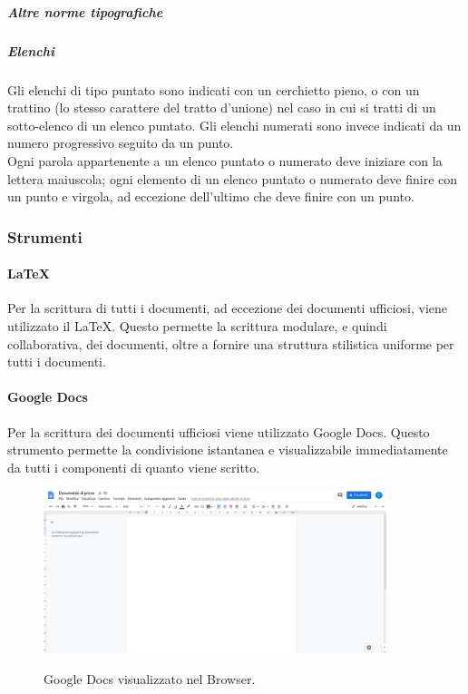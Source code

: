\documentclass[../norme-di-progetto.tex]{subfiles}
\begin{document}
\subparagraph{Altre norme tipografiche}
\subparagraph*{Elenchi}
Gli elenchi di tipo puntato sono indicati con un cerchietto pieno, o con un trattino (lo stesso carattere del tratto d'unione) nel caso in cui si tratti di un sotto-elenco di un elenco puntato. Gli elenchi numerati sono invece indicati da un numero progressivo seguito da un punto. \\
Ogni parola appartenente a un elenco puntato o numerato deve iniziare con la lettera maiuscola; ogni elemento di un elenco puntato o numerato deve finire con un punto e virgola, ad eccezione dell'ultimo che deve finire con un punto.

\subsubsection{Strumenti}
\paragraph{\LaTeX}
Per la scrittura di tutti i documenti, ad eccezione dei documenti ufficiosi, viene utilizzato il  \LaTeX. Questo permette la scrittura modulare, e quindi collaborativa, dei documenti, oltre a fornire una struttura stilistica uniforme per tutti i documenti.
\paragraph{Google Docs}
Per la scrittura dei documenti ufficiosi viene utilizzato Google Docs. Questo strumento permette la condivisione istantanea e visualizzabile immediatamente da tutti i componenti di quanto viene scritto.

\begin{figure}[H]
  \centering
  \includegraphics[width=10cm]{img/docs.png}
  \label{fig:github}
  \caption{Google Docs visualizzato nel Browser.}
\end{figure}

\end{document}
